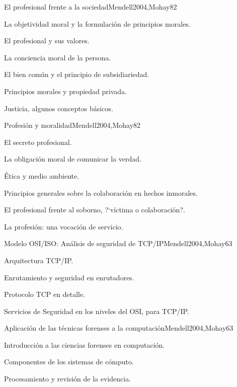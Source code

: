\begin{syllabus}
\begin{unit}{El profesional frente a la sociedad}{Mendell2004,Mohay}{8}{2}
\begin{topics}
      \item {La objetividad moral y la formulación de principios morales.}
      \item {El profesional y sus valores.}
      \item {La conciencia moral de la persona.}
      \item {El bien común y el principio de subsidiariedad.}
      \item {Principios morales y propiedad privada.}
      \item {Justicia, algunos conceptos básicos.}
\end{topics}
\end{unit}

\begin{unit}{Profesión y moralidad}{Mendell2004,Mohay}{8}{2}
\begin{topics}
      \item {El secreto profesional.}
      \item {La obligación moral de comunicar la verdad.}
      \item {Ética y medio ambiente.}
      \item {Principios generales sobre la colaboración en hechos inmorales.}
      \item {El profesional frente al soborno, ?`víctima o colaboración?.}
      \item {La profesión: una vocación de servicio.}
\end{topics}
\end{unit}

\begin{unit}{Modelo OSI/ISO: Análisis de seguridad de TCP/IP}{Mendell2004,Mohay}{6}{3}
\begin{topics}
      \item {Arquitectura TCP/IP.}
      \item {Enrutamiento y seguridad en enrutadores.}
      \item {Protocolo TCP en detalle.}
      \item {Servicios de Seguridad en los niveles del OSI, para TCP/IP.}
\end{topics}
\end{unit}

\begin{unit}{Aplicación de las técnicas forenses a la computación}{Mendell2004,Mohay}{6}{3}
\begin{topics}
      \item {Introducción a las ciencias forenses en computación.}
      \item {Componentes de los sistemas de cómputo.}
      \item {Procesamiento y revisión de la evidencia.}
\end{topics}
\end{unit}


\end{syllabus}
